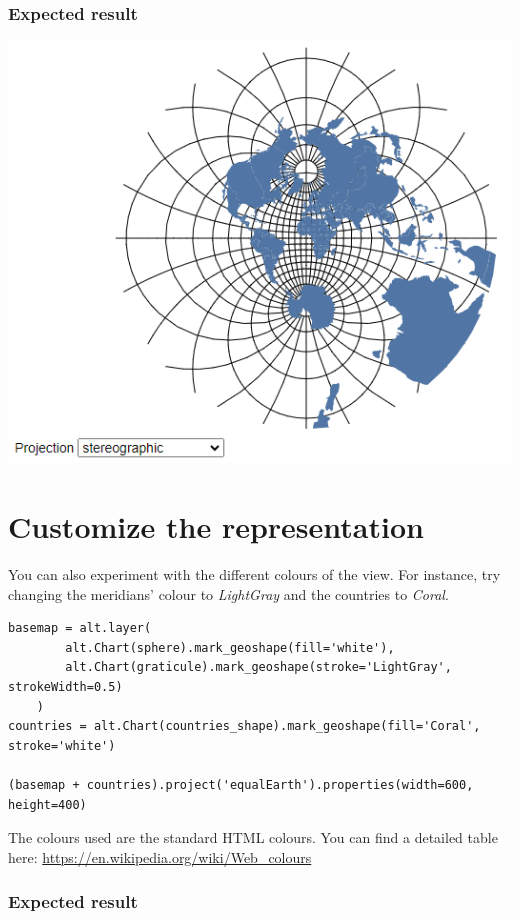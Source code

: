 \documentclass[11pt]{article}
\begin{document}
\subsubsection*{Expected result}

\begin{center}
\includegraphics[width=.6\textwidth]{visualization (3).png}
\end{center}

\section{Customize the representation}

You can also experiment with the different colours of the view. For instance, try changing the meridians' colour to \textit{LightGray} and the countries to \textit{Coral}.

\begin{verbatim}
basemap = alt.layer(
        alt.Chart(sphere).mark_geoshape(fill='white'),
        alt.Chart(graticule).mark_geoshape(stroke='LightGray', strokeWidth=0.5)
    )
countries = alt.Chart(countries_shape).mark_geoshape(fill='Coral', stroke='white')

(basemap + countries).project('equalEarth').properties(width=600, height=400)
\end{verbatim}

The colours used are the standard HTML colours. You can find a detailed table here:
\url{https://en.wikipedia.org/wiki/Web_colours}

\subsubsection*{Expected result}
\end{document}
